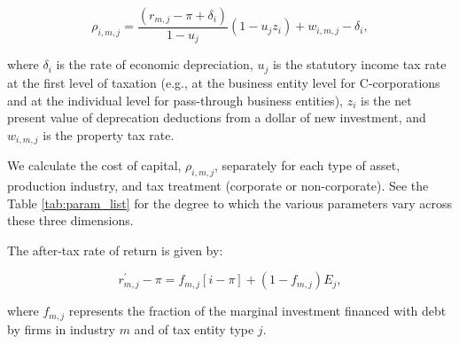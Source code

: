 \documentclass[article,11pt,letterpaper,fleqn]{article}
\theoremstyle{definition}
\numberwithin{equation}{section}
\begin{document}
\begin{equation}
\rho_{i,m,j} = \frac{(r_{m,j}-\pi+\delta_{i})}{1-u_{j}}(1-u_{j}z_{i})+w_{i,m,j}-\delta_{i},
\end{equation}  

\noindent\noindent where $\delta_{i}$ is the rate of economic depreciation, $u_{j}$ is the statutory income tax rate at the first level of taxation (e.g., at the business entity level for C-corporations and at the individual level for pass-through business entities), $z_{i}$ is the net present value of deprecation deductions from a dollar of new investment, and $w_{i,m,j}$ is the property tax rate.  


We calculate the cost of capital, $\rho_{i,m,j}$, separately for each type of asset, production industry, and tax treatment (corporate or non-corporate).  See the Table \ref{tab:param_list} for the degree to which the various parameters vary across these three dimensions.  

The after-tax rate of return is given by:

\begin{equation}
r^{'}_{m,j}-\pi = f_{m,j}\left[i-\pi\right] + (1-f_{m,j})E_{j},
\end{equation}

\noindent\noindent where $f_{m,j}$ represents the fraction of the marginal investment financed with debt by firms in industry $m$ and of tax entity type $j$.
\end{document}
